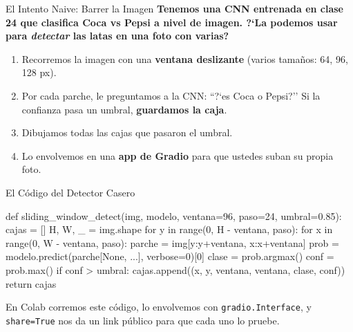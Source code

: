 \documentclass[aspectratio=169, 11pt]{beamer}
\begin{document}
\begin{frame}[shrink]{El Intento Naive: Barrer la Imagen}
  \vspace{6pt}
  {\footnotesize\color{arcaDark}\bfseries
    Tenemos una CNN entrenada en clase 24 que clasifica
    \textbf{Coca vs Pepsi} a nivel de imagen. ?`La podemos usar para
    \emph{detectar} las latas en una foto con varias?}

  \vspace{14pt}
  {\footnotesize
  \begin{enumerate}\setlength{\itemsep}{6pt}
    \item[{\color{arcaRed}\bfseries 1.}]
      Recorremos la imagen con una \textbf{ventana deslizante}
      (varios tama\~nos: 64, 96, 128 px).
    \item[{\color{arcaRed}\bfseries 2.}]
      Por cada parche, le preguntamos a la CNN: ``?`es Coca o Pepsi?''
      Si la confianza pasa un umbral, \textbf{guardamos la caja}.
    \item[{\color{arcaRed}\bfseries 3.}]
      Dibujamos todas las cajas que pasaron el umbral.
    \item[{\color{codeGreen}\bfseries 4.}]
      Lo envolvemos en una \textbf{app de Gradio} para que ustedes
      suban su propia foto.
  \end{enumerate}
  }
\end{frame}

\begin{frame}{El C\'odigo del Detector Casero}
  \vspace{-4pt}
  \begin{pyblock}
def sliding_window_detect(img, modelo, ventana=96, paso=24, umbral=0.85):
    cajas = []
    H, W, _ = img.shape
    for y in range(0, H - ventana, paso):
        for x in range(0, W - ventana, paso):
            parche = img[y:y+ventana, x:x+ventana]
            prob = modelo.predict(parche[None, ...], verbose=0)[0]
            clase = prob.argmax()
            conf  = prob.max()
            if conf > umbral:
                cajas.append((x, y, ventana, ventana, clase, conf))
    return cajas
  \end{pyblock}

  \vspace{4pt}
  {\scriptsize\color{textMuted}
    \faLightbulb\hspace{4pt} En Colab corremos este c\'odigo, lo
    envolvemos con \texttt{gradio.Interface}, y \texttt{share=True}
    nos da un link p\'ublico para que cada uno lo pruebe.}
\end{frame}
\end{document}

